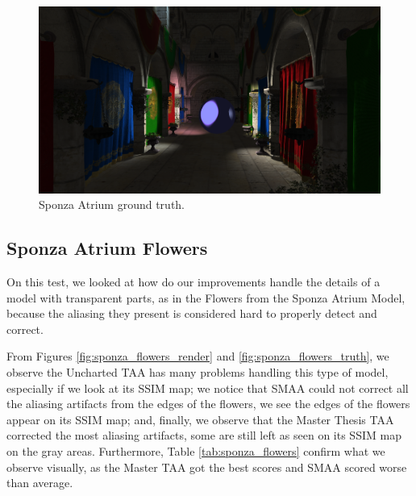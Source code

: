\documentclass[pregrado]{tesis-usb} %
\begin{document}
\begin{figure}[H]
	\centering
	\includegraphics[scale=0.1]{images/results/sponza_sobel_ground_truth.png}
	\caption{Sponza Atrium ground truth.}\label{fig:sponza_truth}
\end{figure}

\subsection{Sponza Atrium Flowers}
On this test, we looked at how do our improvements handle the details of a model with transparent parts, as in the Flowers from the Sponza Atrium Model, because the aliasing they present is considered hard to properly detect and correct.

From Figures \ref{fig:sponza_flowers_render} and \ref{fig:sponza_flowers_truth}, we observe the Uncharted TAA has many problems handling this type of model, especially if we look at its SSIM map; we notice that SMAA could not correct all the aliasing artifacts from the edges of the flowers, we see the edges of the flowers appear on its SSIM map; and, finally, we observe that the Master Thesis TAA corrected the most aliasing artifacts, some are still left as seen on its SSIM map on the gray areas. Furthermore, Table \ref{tab:sponza_flowers} confirm what we observe visually, as the Master TAA got the best scores and SMAA scored worse than average.
\end{document}
